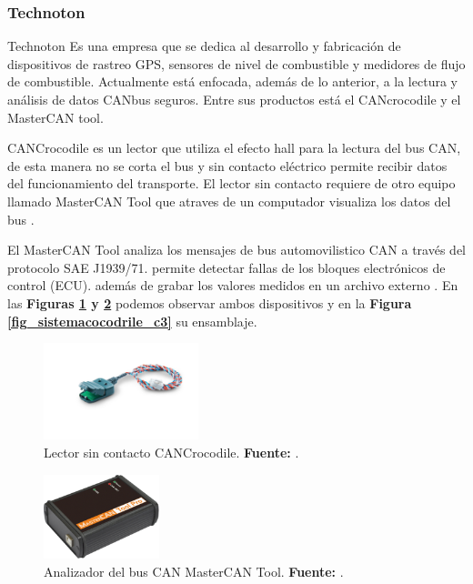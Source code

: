 \subsubsection{Technoton}
Technoton  Es una empresa que se dedica al desarrollo y fabricación de dispositivos de rastreo GPS, sensores de nivel de combustible y medidores de flujo de combustible. Actualmente está enfocada, además de lo anterior, a la lectura y análisis de datos CANbus seguros\cite{cite_technoton_c3}. Entre sus productos está el CANcrocodile y  el MasterCAN tool. 


CANCrocodile es un lector que utiliza el efecto hall para la lectura del bus CAN, de esta manera no se corta el bus y sin contacto eléctrico permite recibir datos del funcionamiento del transporte.  El lector sin contacto requiere de otro equipo llamado  MasterCAN Tool que atraves de un computador visualiza los datos del bus \cite{cite_cocodrile_c3}. 


El MasterCAN Tool analiza los mensajes de bus automovilistico CAN a través del protocolo SAE J1939/71. permite detectar fallas de los bloques electrónicos de control (ECU). además de grabar los valores medidos en un archivo externo \cite{cite_mastertool_c3}. En las   \textbf{Figuras \ref{fig_cocodrile_c3} y \ref{fig_mastertool_c3}} podemos observar ambos dispositivos y en la \textbf{Figura \ref{fig_sistemacocodrile_c3}} su ensamblaje. 


\begin{figure}[H]
	\centering
	\includegraphics[width=0.4\textwidth]{./Cap3imagen/cocodrile.jpg}
	\caption[Lector sin contacto CANCrocodile.]{Lector sin contacto CANCrocodile.\textbf{ Fuente:} \cite{cite_cocodrile_c3}.}
	\label{fig_cocodrile_c3} %
\end{figure}


\begin{figure}[H]
	\centering
	\includegraphics[width=0.3\textwidth]{./Cap3imagen/mastercan-tool.png}
	\caption[Analizador del bus CAN MasterCAN Tool.]{Analizador del bus CAN MasterCAN Tool.\textbf{ Fuente:} \cite{cite_mastertool_c3}.}
	\label{fig_mastertool_c3} %
\end{figure}

